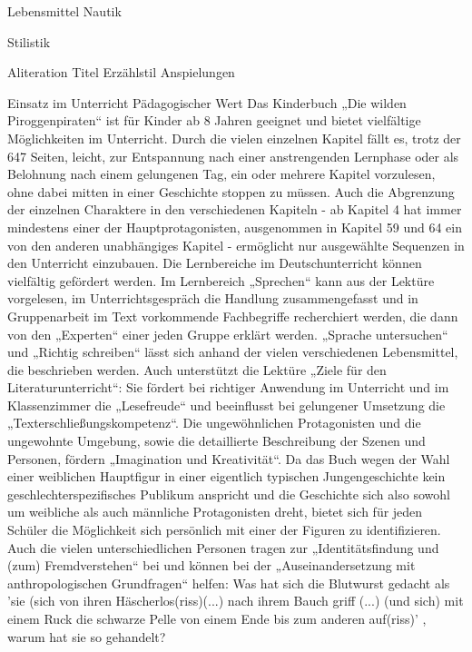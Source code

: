 Lebensmittel
Nautik

Stilistik

Aliteration Titel
Erzählstil
Anspielungen
					
					


Einsatz im Unterricht
Pädagogischer Wert
Das Kinderbuch „Die wilden Piroggenpiraten“ ist für Kinder ab 8 Jahren geeignet und bietet vielfältige Möglichkeiten im Unterricht. Durch die vielen einzelnen Kapitel fällt es, trotz der 647 Seiten, leicht, zur Entspannung nach einer anstrengenden Lernphase oder als Belohnung nach einem gelungenen Tag, ein oder mehrere Kapitel vorzulesen, ohne dabei mitten in einer Geschichte stoppen zu müssen. Auch die Abgrenzung der einzelnen Charaktere in den verschiedenen Kapiteln - ab Kapitel 4 hat immer mindestens einer der Hauptprotagonisten, ausgenommen in Kapitel 59 und 64 ein von den anderen unabhängiges Kapitel - ermöglicht nur ausgewählte Sequenzen in den Unterricht einzubauen. Die Lernbereiche im Deutschunterricht können vielfältig gefördert werden. Im Lernbereich „Sprechen“  kann aus der Lektüre vorgelesen, im Unterrichtsgespräch die Handlung zusammengefasst und in Gruppenarbeit im Text vorkommende Fachbegriffe recherchiert werden, die dann von den „Experten“ einer jeden Gruppe erklärt werden. „Sprache untersuchen“ und „Richtig schreiben“ lässt sich anhand der vielen verschiedenen Lebensmittel, die beschrieben werden. Auch unterstützt die Lektüre „Ziele für den Literaturunterricht“: Sie fördert bei richtiger Anwendung im Unterricht und im Klassenzimmer die „Lesefreude“ und beeinflusst bei gelungener Umsetzung die „Texterschließungskompetenz“. Die ungewöhnlichen Protagonisten und die ungewohnte Umgebung, sowie die detaillierte Beschreibung der Szenen und Personen, fördern „Imagination und Kreativität“. Da das Buch wegen der Wahl einer weiblichen Hauptfigur in einer eigentlich typischen Jungengeschichte kein geschlechterspezifisches Publikum anspricht und die Geschichte sich also sowohl um weibliche als auch männliche Protagonisten dreht, bietet sich für jeden Schüler die Möglichkeit sich persönlich mit einer der Figuren zu identifizieren. Auch die vielen unterschiedlichen Personen tragen zur „Identitätsfindung und (zum) Fremdverstehen“ bei und können bei der „Auseinandersetzung mit anthropologischen Grundfragen“ helfen: Was hat sich die Blutwurst gedacht  als 'sie (sich von ihren Häscherlos(riss)(...) nach ihrem Bauch griff (...) (und sich) mit einem Ruck die schwarze Pelle von einem Ende bis zum anderen auf(riss)' \cite[S.229]{pir},  warum hat sie so gehandelt?



